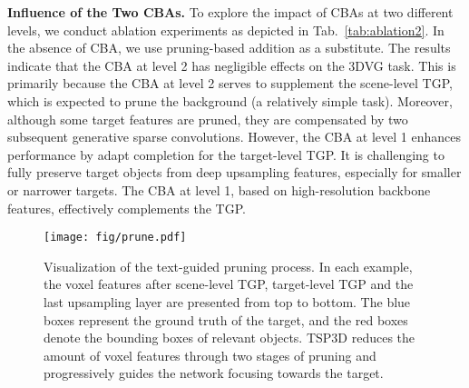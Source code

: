 

\textbf{Influence of the Two CBAs.}
To explore the impact of CBAs at two different levels, we conduct ablation experiments as depicted in Tab.~\ref{tab:ablation2}. In the absence of CBA, we use pruning-based addition as a substitute. The results indicate that the CBA at level 2 has negligible effects on the 3DVG task. This is primarily because the CBA at level 2 serves to supplement the scene-level TGP, which is expected to prune the background (a relatively simple task). Moreover, although some target features are pruned, they are compensated by two subsequent generative sparse convolutions. However, the CBA at level 1 enhances performance by adapt completion for the target-level TGP. It is challenging to fully preserve target objects from deep upsampling features, especially for smaller or narrower targets. The CBA at level 1, based on high-resolution backbone features, effectively complements the TGP.


\begin{figure*}[t]
	\centering
	\texttt{[image: fig/prune.pdf]}
    \vspace{-.2cm}
    \caption{Visualization of the text-guided pruning process. In each example, the voxel features after scene-level TGP, target-level TGP and the last upsampling layer are presented from top to bottom. The blue boxes represent the ground truth of the target, and the red boxes denote the bounding boxes of relevant objects. TSP3D reduces the amount of voxel features through two stages of pruning and progressively guides the network focusing towards the target.}
	\label{fig:prune}
	\vspace{-.1cm}
\end{figure*}


